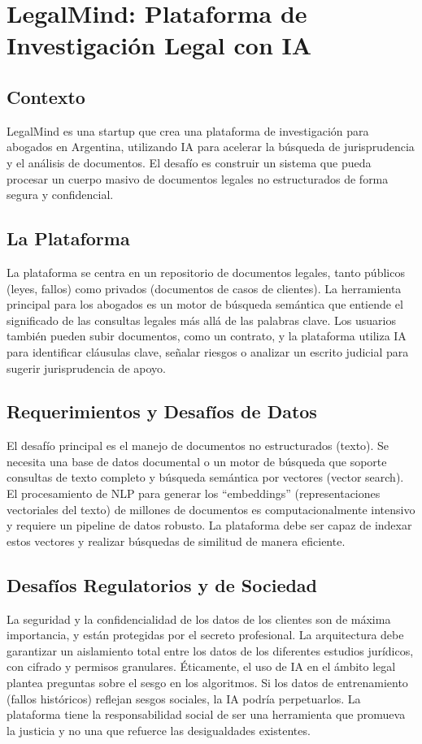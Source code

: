 \documentclass[12pt]{article}
\begin{document}
\newpage

\section{LegalMind: Plataforma de Investigación Legal con IA}

\subsection{Contexto}
LegalMind es una startup que crea una plataforma de investigación para abogados en Argentina, utilizando IA para acelerar la búsqueda de jurisprudencia y el análisis de documentos. El desafío es construir un sistema que pueda procesar un cuerpo masivo de documentos legales no estructurados de forma segura y confidencial.

\subsection{La Plataforma}
La plataforma se centra en un repositorio de documentos legales, tanto públicos (leyes, fallos) como privados (documentos de casos de clientes). La herramienta principal para los abogados es un motor de búsqueda semántica que entiende el significado de las consultas legales más allá de las palabras clave. Los usuarios también pueden subir documentos, como un contrato, y la plataforma utiliza IA para identificar cláusulas clave, señalar riesgos o analizar un escrito judicial para sugerir jurisprudencia de apoyo.

\subsection{Requerimientos y Desafíos de Datos}
El desafío principal es el manejo de documentos no estructurados (texto). Se necesita una base de datos documental o un motor de búsqueda que soporte consultas de texto completo y búsqueda semántica por vectores (vector search). El procesamiento de NLP para generar los ``embeddings'' (representaciones vectoriales del texto) de millones de documentos es computacionalmente intensivo y requiere un pipeline de datos robusto. La plataforma debe ser capaz de indexar estos vectores y realizar búsquedas de similitud de manera eficiente.

\subsection{Desafíos Regulatorios y de Sociedad}
La seguridad y la confidencialidad de los datos de los clientes son de máxima importancia, y están protegidas por el secreto profesional. La arquitectura debe garantizar un aislamiento total entre los datos de los diferentes estudios jurídicos, con cifrado y permisos granulares. Éticamente, el uso de IA en el ámbito legal plantea preguntas sobre el sesgo en los algoritmos. Si los datos de entrenamiento (fallos históricos) reflejan sesgos sociales, la IA podría perpetuarlos. La plataforma tiene la responsabilidad social de ser una herramienta que promueva la justicia y no una que refuerce las desigualdades existentes.
\end{document}
